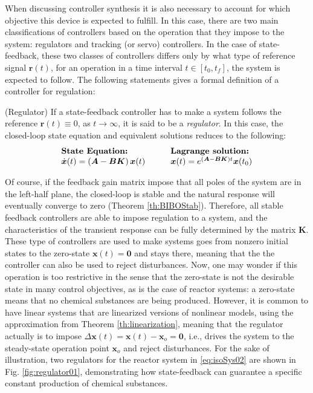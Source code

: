 \documentclass[a4paper,11pt]{book}
\numberwithin{figure}{chapter}
\numberwithin{equation}{chapter}
\numberwithin{table}{chapter}
\theoremstyle{definition}
\newtheorem{definition}{Definition}[chapter]
\newcounter{boxed-theorem}
\newcounter{boxed-definition}
\newenvironment{boxed-definition}[1]
{\begin{shaded} \begin{definition}{#1}}
{\end{definition} \end{shaded}}
\begin{document}
When discussing controller synthesis it is also necessary to account for which objective this device is expected to fulfill. In this case, there are two main classifications of controllers based on the operation that they impose to the system: regulators and tracking (or servo) controllers. In the case of state-feedback, these two classes of controllers differs only by what type of reference signal $\bm{r}(t)$, for an operation in a time interval $t \in [t_0, t_f]$, the system is expected to follow. The following statements gives a formal definition of a controller for regulation:

\begin{boxed-definition}{(Regulator)} \label{def:regulator}
	If a state-feedback controller has to make a system follows the reference $\bm{r}(t) \equiv 0$, as $t \to \infty$, it is said to be a \textit{regulator}. In this case, the closed-loop state equation and equivalent solutions reduces to the following:
		\begin{align}
	\begin{matrix*}[l]
	\textbf{State Equation:} \hfill & & & \textbf{Lagrange solution:} \hfill \\
	\dot{\bm{x}}(t) = \left( \bm{A} - \bm{B} \bm{K} \right) \bm{x}(t)  & & &
	\bm{x}(t) = e^{(\bm{A} - \bm{B} \bm{K}) t} \bm{x}(t_0) \hfill
	\end{matrix*}
	\end{align}
\end{boxed-definition}

Of course, if the feedback gain matrix impose that all poles of the system are in the left-half plane, the closed-loop is stable and the natural response will eventually converge to zero (Theorem \ref{th:BIBOStab}). Therefore, all stable feedback controllers are able to impose regulation to a system, and the characteristics of the transient response can be fully determined by the matrix $\bm{K}$. These type of controllers are used to make systems goes from nonzero initial states to the zero-state $\bm{x}(t) = \bm{0}$ and stays there, meaning that the the controller can also be used to reject disturbances. Now, one may wonder if this operation is too restrictive in the sense that the zero-state is not the desirable state in many control objectives, as is the case of reactor systems: a zero-state means that no chemical substances are being produced. However, it is common to have linear systems that are 	linearized versions of nonlinear models, using the approximation from Theorem \ref{th:linearization}, meaning that the regulator actually is to impose $\Delta \bm{x}(t) = \bm{x}(t) - \bm{x}_o = \bm{0}$, i.e., drives the system to the steady-state operation point $\bm{x}_o$ and reject disturbances. For the sake of illustration, two regulators for the reactor system in \eqref{eq:isoSys02} are shown in Fig. \ref{fig:regulator01}, demonstrating how state-feedback can guarantee a specific constant production of chemical substances.
\end{document}

